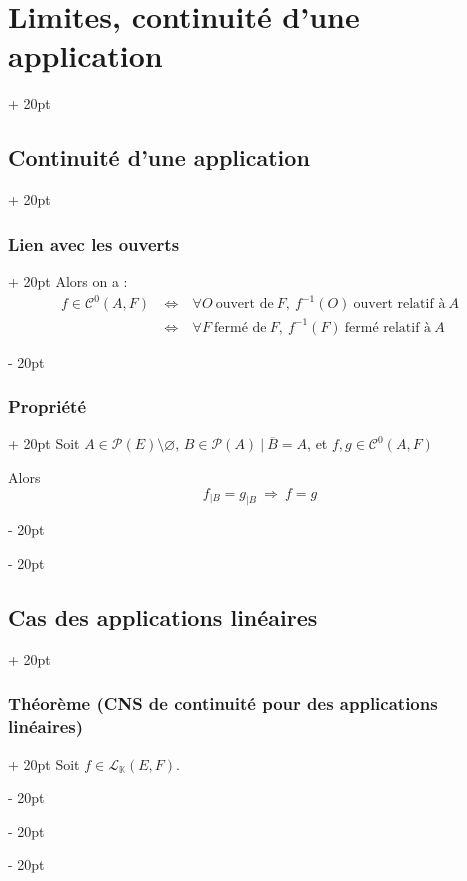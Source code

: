 \documentclass[a4paper, 12pt, twoside]{article}
\newcommand{\K}{\mathbb K}
\newcommand{\cj}[1]{\overline{#1}} %
\newcommand{\ssi}{\ \Leftrightarrow \ }
\newcommand{\ind}[1][20pt]{\advance\leftskip + #1}
\newcommand{\deind}[1][20pt]{\advance\leftskip - #1}
\newenvironment{indt}[2][20pt]{#2 \par \ind[#1]}{\par \deind} %
\begin{document}
\begin{indt}{\section{Limites, continuité d'une application}}
\begin{indt}{\subsection{Continuité d'une application}}
\begin{indt}{\subsubsection{Lien avec les ouverts}}
                Alors on a :
                \[
                    \begin{array}{rcl}
                        f \in \mathcal C^0(A, F)
                        &\ssi&
                        \forall O\ \text{ouvert de}\ F,\
                        f^{-1}(O)\ \text{ouvert relatif à}\ A
                        \\
                        &\ssi&
                        \forall F\ \text{fermé de}\ F,\
                        f^{-1}(F)\ \text{fermé relatif à}\ A
                    \end{array}
                \]
            \end{indt}

            \vspace{12pt}
            
            \begin{indt}{\subsubsection{Propriété}}
                Soit $A \in \mathcal P(E) \setminus \varnothing$, $B \in \mathcal P(A)\ |\ \cj B = A$, et $f, g \in \mathcal C^0(A, F)$

                Alors
                \[
                    f_{|B} = g_{|B}\
                    \Rightarrow\
                    f = g
                \]
            \end{indt}
        \end{indt}

        \vspace{12pt}
        
        \begin{indt}{\subsection{Cas des applications linéaires}}
            \begin{indt}{\subsubsection{Théorème (CNS de continuité pour des applications linéaires)}}
                Soit $f \in \mathcal L_\K(E, F)$.


\end{indt}
\end{indt}
\end{indt}
\end{document}
